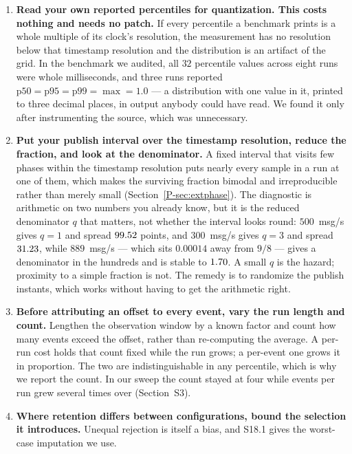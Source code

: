 \documentclass[10pt,journal,onecolumn]{IEEEtran}
\newcommand{\mainPhase}{\ref{P-sec:extphase}}            %
\begin{document}
\begin{enumerate}
\item \textbf{Read your own reported percentiles for quantization. This costs nothing and needs no
patch.} If every percentile a benchmark prints is a whole multiple of its clock's resolution, the
measurement has no resolution below that timestamp resolution and the distribution is an artifact of the grid.
In the benchmark we audited, all $32$ percentile values across eight runs were whole milliseconds,
and three runs reported $\mathrm{p50} = \mathrm{p95} = \mathrm{p99} = \max = 1.0$ --- a
distribution with one value in it, printed to three decimal places, in output anybody could have
read. We found it only after instrumenting the source, which was unnecessary.
\item \textbf{Put your publish interval over the timestamp resolution, reduce the fraction, and look at
the denominator.} A fixed interval that visits few phases within the timestamp resolution puts nearly every
sample in a run at one of them, which makes the surviving fraction bimodal and irreproducible
rather than merely small (Section~\mainPhase{}). The diagnostic is
arithmetic on two numbers you already know, but it is the reduced denominator $q$ that matters, not
whether the interval looks round: $500$~msg/s gives $q=1$ and spread $99.52$ points, and
$300$~msg/s gives $q=3$ and spread $31.23$, while $889$~msg/s --- which sits $0.00014$ away from
$9/8$ --- gives a denominator in the hundreds and is stable to $1.70$. A small $q$ is the hazard;
proximity to a simple fraction is not. The remedy is to randomize the publish instants, which
works without having to get the arithmetic right.
\item \textbf{Before attributing an offset to every event, vary the run length and count.}
Lengthen the observation window by a known factor and count how many events exceed the offset,
rather than re-computing the average. A per-run cost holds that count fixed while the run grows;
a per-event one grows it in proportion. The two are indistinguishable in any percentile, which is
why we report the count. In our sweep the count stayed at four while events per run grew several
times over (Section~S3).
\item \textbf{Where retention differs between configurations, bound the selection it introduces.}
Unequal rejection is itself a bias, and S18.1 gives the worst-case imputation we use.
\end{enumerate}
\end{document}
